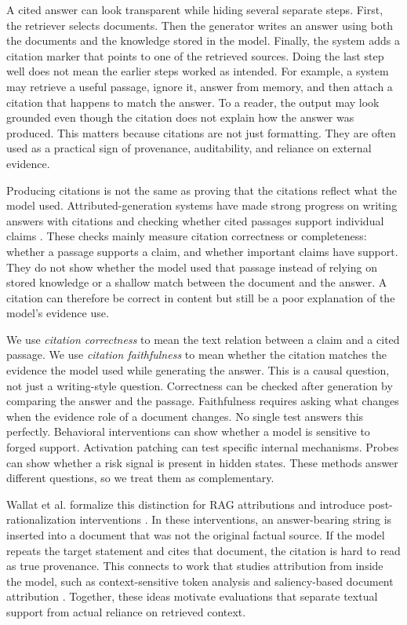 \documentclass[11pt]{article}
\begin{document}
A cited answer can look transparent while hiding several separate steps. First, the retriever selects documents. Then the generator writes an answer using both the documents and the knowledge stored in the model. Finally, the system adds a citation marker that points to one of the retrieved sources. Doing the last step well does not mean the earlier steps worked as intended. For example, a system may retrieve a useful passage, ignore it, answer from memory, and then attach a citation that happens to match the answer. To a reader, the output may look grounded even though the citation does not explain how the answer was produced. This matters because citations are not just formatting. They are often used as a practical sign of provenance, auditability, and reliance on external evidence.

Producing citations is not the same as proving that the citations reflect what the model used. Attributed-generation systems have made strong progress on writing answers with citations and checking whether cited passages support individual claims \cite{gao2023citations}. These checks mainly measure citation correctness or completeness: whether a passage supports a claim, and whether important claims have support. They do not show whether the model used that passage instead of relying on stored knowledge or a shallow match between the document and the answer. A citation can therefore be correct in content but still be a poor explanation of the model's evidence use.

We use \emph{citation correctness} to mean the text relation between a claim and a cited passage. We use \emph{citation faithfulness} to mean whether the citation matches the evidence the model used while generating the answer. This is a causal question, not just a writing-style question. Correctness can be checked after generation by comparing the answer and the passage. Faithfulness requires asking what changes when the evidence role of a document changes. No single test answers this perfectly. Behavioral interventions can show whether a model is sensitive to forged support. Activation patching can test specific internal mechanisms. Probes can show whether a risk signal is present in hidden states. These methods answer different questions, so we treat them as complementary.

Wallat et al. formalize this distinction for RAG attributions and introduce post-rationalization interventions \cite{wallat2025correctness}. In these interventions, an answer-bearing string is inserted into a document that was not the original factual source. If the model repeats the target statement and cites that document, the citation is hard to read as true provenance. This connects to work that studies attribution from inside the model, such as context-sensitive token analysis and saliency-based document attribution \cite{qi2024mirage}. Together, these ideas motivate evaluations that separate textual support from actual reliance on retrieved context.
\end{document}
